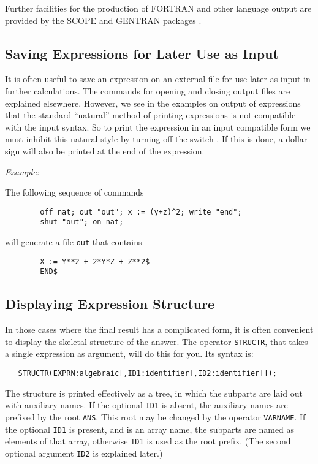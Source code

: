 Further facilities for the production of FORTRAN and other language output
are provided by the SCOPE and GENTRAN packages
.

\subsection{Saving Expressions for Later Use as Input}
\hypertarget{switch:NAT}{}

It is often useful to save an expression on an external file for use later
as input in further calculations. The commands for opening and closing
output files are explained elsewhere. However, we see in the examples on
output of expressions that the standard ``natural'' method of printing
expressions is not compatible with the input syntax. So to print the
expression in an input compatible form we must inhibit this natural style
by turning off the switch . If this is done, a
dollar sign will also be printed at the end of the expression.

\textit{Example:}

The following sequence of commands
\begin{verbatim}
        off nat; out "out"; x := (y+z)^2; write "end";
        shut "out"; on nat;
\end{verbatim}
will generate a file \texttt{out} that contains
\begin{verbatim}
        X := Y**2 + 2*Y*Z + Z**2$
        END$
\end{verbatim}

\subsection{Displaying Expression Structure}
\hypertarget{operator:STRUCTR}{}

In those cases where the final result has a complicated form, it is often
convenient to display the skeletal structure of the answer.  The operator
\texttt{STRUCTR}, that takes a single expression as argument,
will do this for you.  Its syntax is:
\begin{verbatim}
   STRUCTR(EXPRN:algebraic[,ID1:identifier[,ID2:identifier]]);
\end{verbatim}
The structure is printed effectively as a tree, in which the subparts are
laid out with auxiliary names.  If the optional \texttt{ID1} is absent, the
auxiliary names are prefixed by the root \texttt{ANS}.  This root may be
changed by the operator \texttt{VARNAME}.  If the
optional \texttt{ID1} is present, and is an array name, the subparts are
named as elements of that array, otherwise \texttt{ID1} is used as the root
prefix. (The second optional argument \texttt{ID2} is explained later.)


